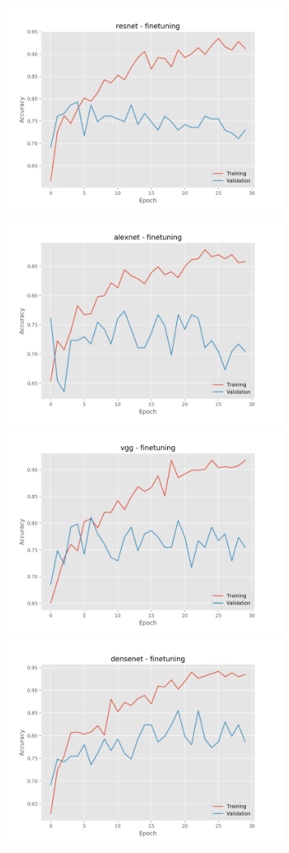 \documentclass[]{kththesis}
\begin{document}
  \begin{figure}[h]
    \includegraphics[width=9cm]{f_a_resnet_fine}
    \includegraphics[width=9cm]{f_a_alexnet_fine}
    \includegraphics[width=9cm]{f_a_vgg_fine}
    \includegraphics[width=9cm]{f_a_densenet_fine}

\end{figure}
\end{document}
